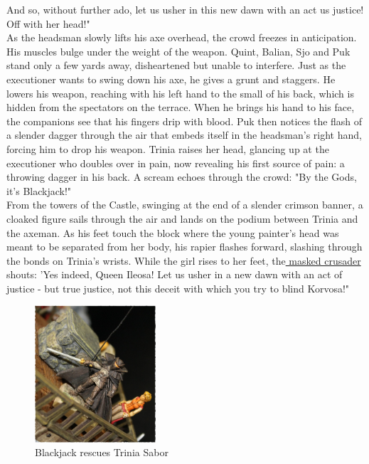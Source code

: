 And so, without further ado, let us usher in this new dawn with an act us justice! Off with her head!"\\

As the headsman slowly lifts his axe overhead, the crowd freezes in anticipation. His muscles bulge under the weight of the weapon. Quint, Balian, Sjo and Puk stand only a few yards away, disheartened but unable to interfere. Just as the executioner wants to swing down his axe, he gives a grunt and staggers. He lowers his weapon, reaching with his left hand to the small of his back, which is hidden from the spectators on the terrace. When he brings his hand to his face, the companions see that his fingers drip with blood. Puk then notices the flash of a slender dagger through the air that embeds itself in the headsman's right hand, forcing him to drop his weapon. Trinia raises her head, glancing up at the executioner who doubles over in pain, now revealing his first source of pain: a throwing dagger in his back. A scream echoes through the crowd: "By the Gods, it's Blackjack!"\\

From the towers of the Castle, swinging at the end of a slender crimson banner, a cloaked figure sails through the air and lands on the podium between Trinia and the axeman. As his feet touch the block where the young painter's head was meant to be separated from her body, his rapier flashes forward, slashing through the bonds on Trinia's wrists. While the girl rises to her feet, the\hyperref[fig:Blackjack-rescues-Trinia-Sabor-472558046]{ masked crusader } shouts: 'Yes indeed, Queen Ileosa! Let us usher in a new dawn with an act of justice - but true justice, not this deceit with which you try to blind Korvosa!" \\

\begin{figure}[h]
	\centering
	\includegraphics[width=0.4\textwidth]{images/Blackjack-rescues-Trinia-Sabor-472558046_mod.jpg}
	\caption{Blackjack rescues Trinia Sabor}
	\label{fig:Blackjack-rescues-Trinia-Sabor-472558046}
\end{figure}

